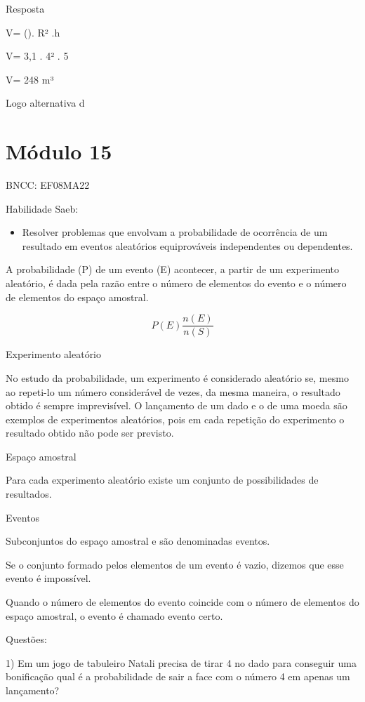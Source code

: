Resposta

V= (\Pi). R² .h

V= 3,1 . 4² . 5

V= 248 m³

Logo alternativa d

\section{Módulo 15}

BNCC: EF08MA22

Habilidade Saeb:

\begin{itemize}
\tightlist
\item
  Resolver problemas que envolvam a probabilidade de ocorrência de um
  resultado em eventos aleatórios equiprováveis independentes ou
  dependentes.
\end{itemize}

A probabilidade (P) de um evento (E) acontecer, a partir de um
experimento aleatório, é dada pela razão entre o número de elementos do
evento e o número de elementos do espaço amostral.

\[P(E)\frac{n(E)}{n(S)}\]

Experimento aleatório

No estudo da probabilidade, um experimento é considerado aleatório se,
mesmo ao repeti-lo um número considerável de vezes, da mesma maneira, o
resultado obtido é sempre imprevisível. O lançamento de um dado e o de
uma moeda são exemplos de experimentos aleatórios, pois em cada
repetição do experimento o resultado obtido não pode ser previsto.

Espaço amostral

Para cada experimento aleatório existe um conjunto de possibilidades de
resultados.

Eventos

Subconjuntos do espaço amostral e são denominadas eventos.

Se o conjunto formado pelos elementos de um evento é vazio, dizemos que
esse evento é impossível.

Quando o número de elementos do evento coincide com o número de
elementos do espaço amostral, o evento é chamado evento certo.

Questões:

1) Em um jogo de tabuleiro Natali precisa de tirar 4 no dado para
conseguir uma bonificação qual é a probabilidade de sair a face com o
número 4 em apenas um lançamento?

